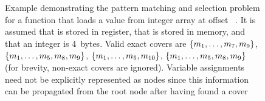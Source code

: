 \begin{figure}
  \centering%
                {%
                  \begin{lstpage}{2.6cm}%
                  \end{lstpage}%
                }%
  \hfill%
  \hfill%

  \caption[Example of the pattern matching and selection problem]%
          {%
            Example demonstrating the pattern matching and selection problem for
            a function that loads a value from integer array  at
            offset \mbox{ \irCode*{\irAddText{}} }.
            It is assumed that  is stored in register, that 
            is stored in memory, and that an integer is \num{4}~bytes.
            Valid exact covers are \mbox{$\mSet{m_1, \ldots, m_7, m_9}$},
            \mbox{$\mSet{m_1, \ldots, m_5, m_8, m_9}$}, \mbox{$\mSet{m_1,
                \ldots, m_5, m_{10}}$}, \mbox{$\mSet{m_1, \ldots, m_5, m_8,
                m_9}$} (for brevity, non-exact covers are ignored).
            Variable assignments need not be explicitly represented as nodes
            since this information can be propagated from the root node after
            having found a cover%
          }
\end{figure}


